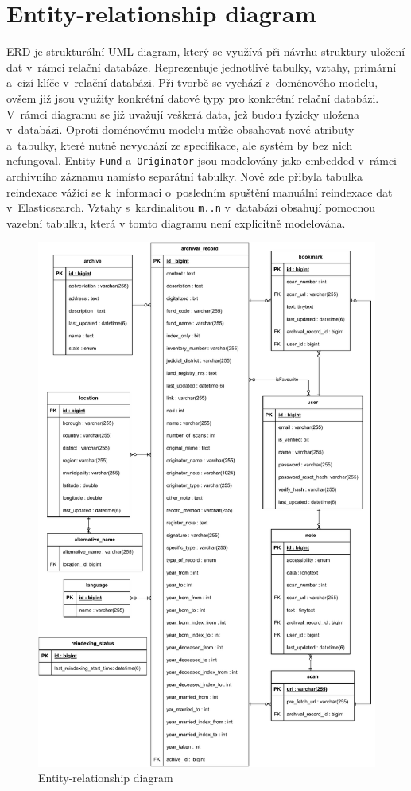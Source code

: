\section{Entity-relationship diagram}
ERD \cite{erdDiagram} je strukturální UML diagram, který se využívá při návrhu struktury uložení dat v~rámci relační databáze. Reprezentuje jednotlivé tabulky, vztahy, primární a~cizí klíče v~relační databázi. Při tvorbě se vychází z~doménového modelu, ovšem již jsou využity konkrétní datové typy pro konkrétní relační databázi. V~rámci diagramu se již uvažují veškerá data, jež budou fyzicky uložena v~databázi. Oproti doménovému modelu může obsahovat nové atributy a~tabulky, které nutně nevychází ze specifikace, ale systém by bez nich nefungoval. Entity \texttt{Fund} a~\texttt{Originator} jsou modelovány jako embedded v~rámci archivního záznamu namísto separátní tabulky. Nově zde přibyla tabulka reindexace vážící se k~informaci o~posledním spuštění manuální reindexace dat v~Elasticsearch. Vztahy s~kardinalitou \texttt{m..n} v~databázi obsahují pomocnou vazební tabulku, která v tomto diagramu není explicitně modelována.
\begin{figure}[htbp]
    \centering
        \includegraphics[scale=.7]{obrazky-figures/design/er_diagram.pdf}
        \caption{Entity-relationship diagram}
\end{figure}


